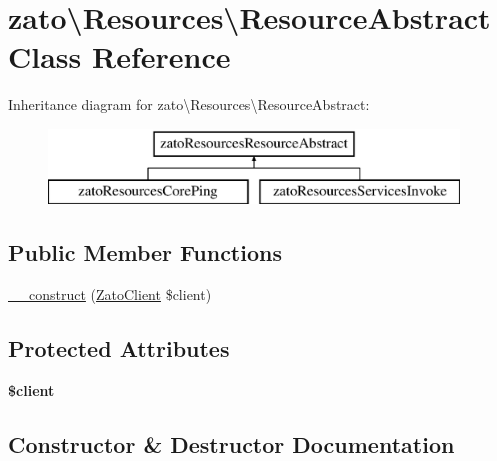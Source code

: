 \hypertarget{classzato_1_1_resources_1_1_resource_abstract}{}\section{zato\textbackslash{}Resources\textbackslash{}Resource\+Abstract Class Reference}
\label{classzato_1_1_resources_1_1_resource_abstract}
Inheritance diagram for zato\textbackslash{}Resources\textbackslash{}Resource\+Abstract\+:\begin{figure}[H]
\begin{center}
\leavevmode
\includegraphics[height=2.000000cm]{classzato_1_1_resources_1_1_resource_abstract}
\end{center}
\end{figure}
\subsection*{Public Member Functions}
\begin{DoxyCompactItemize}
\item 
\hyperlink{classzato_1_1_resources_1_1_resource_abstract_aa98406a8a1925c090cdb54690abe8286}{\+\_\+\+\_\+construct} (\hyperlink{classzato_1_1_zato_client}{Zato\+Client} \$client)
\end{DoxyCompactItemize}
\subsection*{Protected Attributes}
\begin{DoxyCompactItemize}
\item 
\hypertarget{classzato_1_1_resources_1_1_resource_abstract_a7f7f386dbbc5dd2cc54f8b70779d5776}{}{\bfseries \$client}\label{classzato_1_1_resources_1_1_resource_abstract_a7f7f386dbbc5dd2cc54f8b70779d5776}

\end{DoxyCompactItemize}


\subsection{Constructor \& Destructor Documentation}
\hypertarget{classzato_1_1_resources_1_1_resource_abstract_aa98406a8a1925c090cdb54690abe8286}{}
